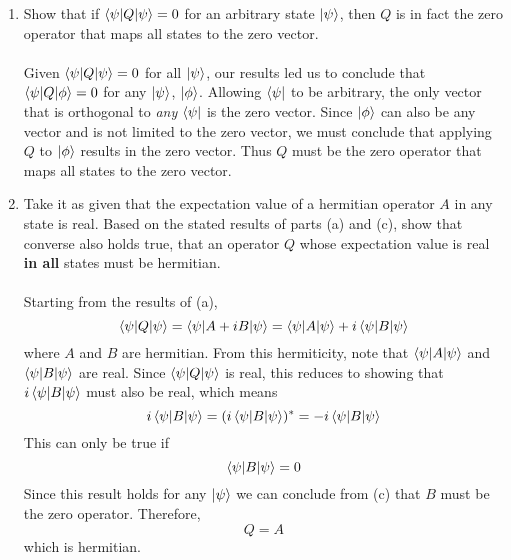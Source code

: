\documentclass[11pt,letterpaper]{article}
\begin{document}
\begin{enumerate}
\begin{enumerate}
\item Show that if $\braket{\psi|Q|\psi} = 0$ for an arbitrary state $\ket \psi$, then $Q$ is in fact the zero operator that maps all states to the zero vector.
\\ \\Given $\braket{\psi|Q|\psi}=0$ for all $\ket\psi$, our results led us to conclude that $\braket{\psi|Q|\phi} = 0$ for any $\ket \psi$, $\ket \phi$. Allowing $\bra\psi$ to be arbitrary, the only vector that is orthogonal to \emph{any} $\bra \psi$ is the zero vector. Since $\ket\phi$ can also be any vector and is not limited to the zero vector, we must conclude that applying $Q$ to $\ket \phi$ results in the zero vector. Thus $Q$ must be the zero operator that maps all states to the zero vector. 
\item Take it as given that the expectation value of a hermitian operator $A$ in any state is real. Based on the stated results of parts (a) and (c), show that converse also holds true, that an operator $Q$ whose expectation value is real \textbf{in all} states must be hermitian.
\\ \\Starting from the results of (a),
$$\braket{\psi|Q|\psi} = \braket{\psi|A+iB|\psi} = \braket{\psi|A|\psi} + i\braket{\psi|B|\psi}$$
where $A$ and $B$ are hermitian. From this hermiticity, note that $\braket{\psi|A|\psi}$ and $\braket{\psi|B|\psi}$ are real. Since $\braket{\psi|Q|\psi}$ is real, this reduces to showing that $i\braket{\psi|B|\psi}$ must also be real, which means
$$i\braket{\psi|B|\psi} = (i\braket{\psi|B|\psi})^* = -i\braket{\psi|B|\psi}$$
This can only be true if 
$$\braket{\psi|B|\psi} = 0$$
Since this result holds for any $\ket \psi$ we can conclude from (c) that $B$ must be the zero operator. Therefore, 
$$Q=A$$
which is hermitian.
\end{enumerate}


\end{enumerate}
\end{document}
